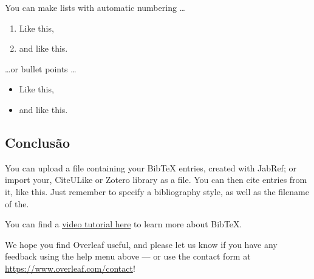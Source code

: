 \documentclass[a4paper]{article}
\begin{document}
You can make lists with automatic numbering \dots

\begin{enumerate}
\item Like this,
\item and like this.
\end{enumerate}
\dots or bullet points \dots
\begin{itemize}
\item Like this,
\item and like this.
\end{itemize}

\subsection{Conclusão}

You can upload a file containing your BibTeX entries, created with JabRef; or import your, CiteULike or Zotero library as a file. You can then cite entries from it, like this. Just remember to specify a bibliography style, as well as the filename of the.

You can find a \href{https://www.overleaf.com/help/97-how-to-include-a-bibliography-using-bibtex}{video tutorial here} to learn more about BibTeX.

We hope you find Overleaf useful, and please let us know if you have any feedback using the help menu above --- or use the contact form at \url{https://www.overleaf.com/contact}!




\selectfont
\end{document}
